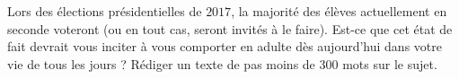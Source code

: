 
\begin{exercice}\label{exosmath-0457}

    Lors des élections présidentielles de $2017$, la majorité des élèves actuellement en seconde voteront (ou en tout cas, seront invités à le faire). Est-ce que cet état de fait devrait vous inciter à vous comporter en adulte dès aujourd'hui dans votre vie de tous les jours ? Rédiger un texte de pas moins de \( 300\) mots sur le sujet.

\end{exercice}
